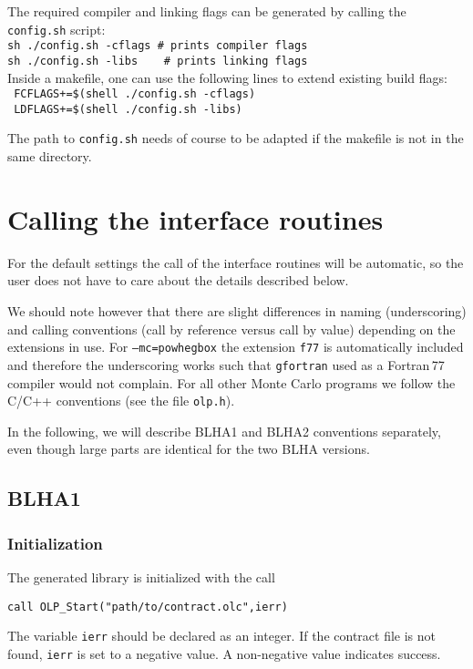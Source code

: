 The required compiler and linking flags can be generated by calling the \texttt{config.sh} script:\\
\texttt{sh ./config.sh -cflags \# prints compiler flags}\\
\texttt{sh ./config.sh -libs \ \ \  \# prints linking flags}\\

Inside a makefile, one can use the following lines to extend existing build flags:\\
\texttt{ FCFLAGS+=\$(shell ./config.sh -cflags)} \\
\texttt{ LDFLAGS+=\$(shell ./config.sh -libs)}

The path to \texttt{config.sh} needs of course to be adapted if the makefile is not in the
same directory.

\section{Calling the interface routines}

For the default settings the call of the interface routines 
will be automatic, so the user does not have to care about the details described below.

We should note however that there are slight differences in naming (underscoring) and calling
conventions (call by reference versus call by value) depending on the
extensions in use. For \texttt{--mc=powhegbox} the extension \texttt{f77}
is automatically included and therefore the underscoring works such that
\texttt{gfortran} used as a Fortran\,77 compiler would not complain.
For all other Monte Carlo programs we follow the C/C++ conventions
(see the file \texttt{olp.h}).

In the following, we will describe BLHA1 and BLHA2 conventions separately, 
even though large parts are identical for the two BLHA versions.

\subsection{BLHA1}

\subsubsection{Initialization}
The generated \gosam{} library is initialized with the call
\begin{lstlisting}[style=fortran]
       call OLP_Start("path/to/contract.olc",ierr)
\end{lstlisting}
The variable \texttt{ierr} should be declared as an integer. If the contract
file is not found, \texttt{ierr} is set to a negative value. A non-negative
value indicates success.

